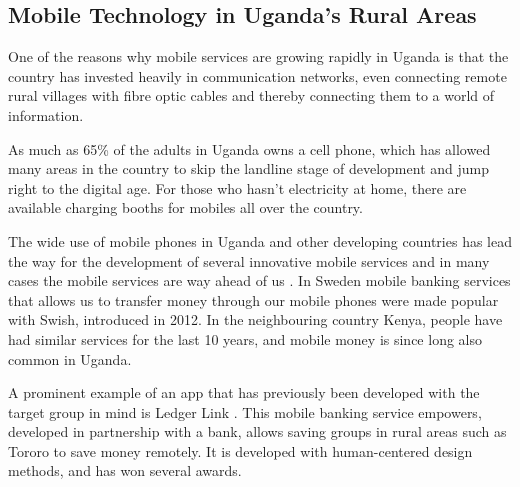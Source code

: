 \subsection{Mobile Technology in Uganda's Rural Areas}\label{sec:mobile-uganda}

One of the reasons why mobile services are growing rapidly in Uganda is that the country has invested heavily in communication networks, even connecting remote rural villages with fibre optic cables and thereby connecting them to a world of information.

As much as 65\% of the adults in Uganda owns a cell phone, which has allowed many areas in the country to skip the landline stage of development and jump right to the digital age. For those who hasn’t electricity at home, there are available charging booths for mobiles all over the country.

The wide use of mobile phones in Uganda and other developing countries has lead the way for the development of several innovative mobile services and in many cases the mobile services are way ahead of us  \citep{nissar}. In Sweden mobile banking services that allows us to transfer money through our mobile phones were made popular with Swish, introduced in 2012. In the neighbouring country Kenya, people have had similar services for the last 10 years, and mobile money is since long also common in Uganda.

A prominent example of an app that has previously been developed with the target group in mind is Ledger Link \citep{ledgerlink}. This mobile banking service empowers, developed in partnership with a bank, allows saving groups in rural areas such as Tororo to save money remotely. It is developed with human-centered design methods, and has won several awards.


%
